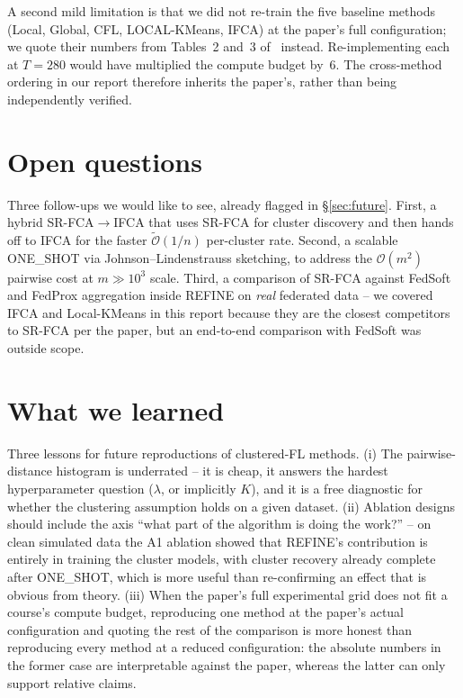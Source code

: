 A second mild limitation is that we did not re-train the five baseline methods (Local, Global, CFL, LOCAL-KMeans, IFCA) at the paper's full configuration; we quote their numbers from Tables~2 and~3 of~\parencite{vardhan2024srfca} instead. Re-implementing each at $T = 280$ would have multiplied the compute budget by~$6$. The cross-method ordering in our report therefore inherits the paper's, rather than being independently verified.

\section{Open questions}\label{sec:open-questions}

Three follow-ups we would like to see, already flagged in \S\ref{sec:future}. First, a hybrid SR-FCA$\to$IFCA that uses SR-FCA for cluster discovery and then hands off to IFCA for the faster $\tilde{\mathcal{O}}(1/n)$ per-cluster rate. Second, a scalable ONE\_SHOT via Johnson--Lindenstrauss sketching, to address the $\mathcal{O}(m^2)$ pairwise cost at $m \gg 10^3$ scale. Third, a comparison of SR-FCA against FedSoft and FedProx aggregation inside REFINE on \emph{real} federated data -- we covered IFCA and Local-KMeans in this report because they are the closest competitors to SR-FCA per the paper, but an end-to-end comparison with FedSoft was outside scope.

\section{What we learned}\label{sec:lessons}

Three lessons for future reproductions of clustered-FL methods. (i) The pairwise-distance histogram is underrated -- it is cheap, it answers the hardest hyperparameter question ($\lambda$, or implicitly $K$), and it is a free diagnostic for whether the clustering assumption holds on a given dataset. (ii) Ablation designs should include the axis ``what part of the algorithm is doing the work?'' -- on clean simulated data the A1 ablation showed that REFINE's contribution is entirely in training the cluster models, with cluster recovery already complete after ONE\_SHOT, which is more useful than re-confirming an effect that is obvious from theory. (iii) When the paper's full experimental grid does not fit a course's compute budget, reproducing one method at the paper's actual configuration and quoting the rest of the comparison is more honest than reproducing every method at a reduced configuration: the absolute numbers in the former case are interpretable against the paper, whereas the latter can only support relative claims.
